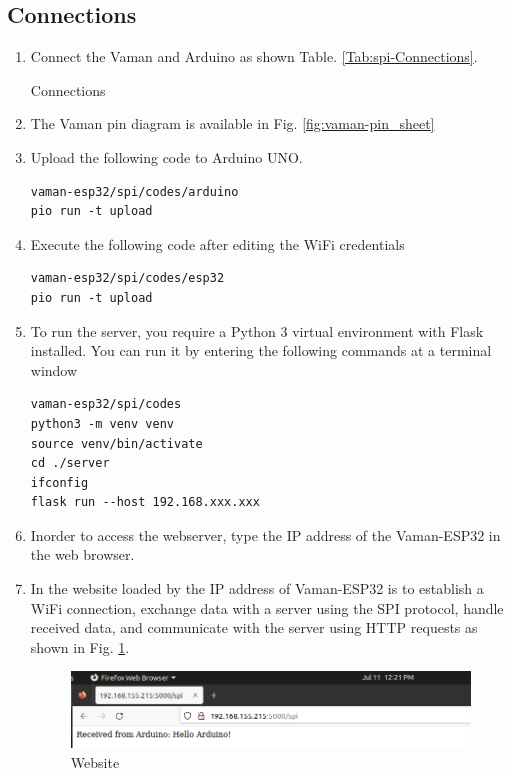 \subsection{Connections}
\begin{enumerate}[label=\thesection.\arabic*.,ref=\thesection.\theenumi]

\item
Connect the Vaman and Arduino as shown Table. \ref{Tab:spi-Connections}.

\begin{table}[!ht]
\centering

\caption{Connections}
\label{Tab:spi-Connections}
\end{table}
\item The Vaman pin diagram is available in Fig. \ref{fig:vaman-pin_sheet}

\item Upload the following code to Arduino UNO.

\begin{lstlisting}
vaman-esp32/spi/codes/arduino
pio run -t upload
\end{lstlisting}

\item Execute the following code after editing the WiFi credentials
\begin{lstlisting}
vaman-esp32/spi/codes/esp32
pio run -t upload 
\end{lstlisting}

\item To run the server, you require a Python 3 virtual environment with Flask
installed. You can run it by entering the following commands at a terminal
window
\begin{lstlisting}
vaman-esp32/spi/codes
python3 -m venv venv
source venv/bin/activate
cd ./server
ifconfig
flask run --host 192.168.xxx.xxx
\end{lstlisting}
\item Inorder to access the webserver, type the IP address of the Vaman-ESP32 in
the web browser.
\item In the website loaded by the IP address of Vaman-ESP32 is to establish a 
WiFi connection, exchange data with a server using the SPI protocol, handle 
received data, and communicate with the server using HTTP requests as shown in 
Fig. \ref{fig:results}.
\begin{figure}[!ht]
\centering
\includegraphics[width=\columnwidth]{vaman-esp32/spi/figs/result.png}
\caption{Website}
\label{fig:results}
\end{figure}
\end{enumerate}
